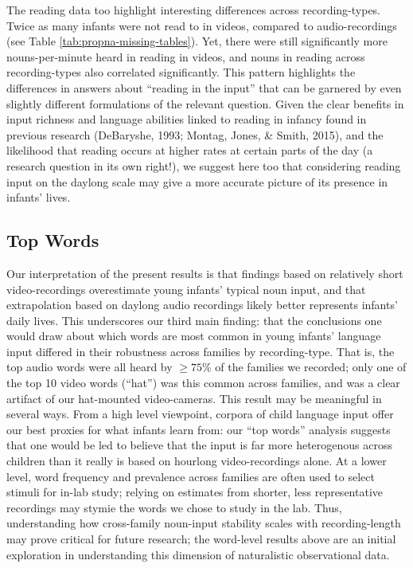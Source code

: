 \documentclass[floatsintext,man]{apa6}
\theoremstyle{definition}
\theoremstyle{definition}
\theoremstyle{definition}
\theoremstyle{remark}
\begin{document}
The reading data too highlight interesting differences across
recording-types. Twice as many infants were not read to in videos,
compared to audio-recordings (see Table
\ref{tab:propna-missing-tables}). Yet, there were still significantly
more nouns-per-minute heard in reading in videos, and nouns in reading
across recording-types also correlated significantly. This pattern
highlights the differences in answers about \enquote{reading in the
input} that can be garnered by even slightly different formulations of
the relevant question. Given the clear benefits in input richness and
language abilities linked to reading in infancy found in previous
research (DeBaryshe, 1993; Montag, Jones, \& Smith, 2015), and the
likelihood that reading occurs at higher rates at certain parts of the
day (a research question in its own right!), we suggest here too that
considering reading input on the daylong scale may give a more accurate
picture of its presence in infants' lives.

\subsection{Top Words}\label{top-words}

Our interpretation of the present results is that findings based on
relatively short video-recordings overestimate young infants' typical
noun input, and that extrapolation based on daylong audio recordings
likely better represents infants' daily lives. This underscores our
third main finding: that the conclusions one would draw about which
words are most common in young infants' language input differed in their
robustness across families by recording-type. That is, the top audio
words were all heard by \(\geq 75\%\) of the families we recorded; only
one of the top 10 video words (\enquote{hat}) was this common across
families, and was a clear artifact of our hat-mounted video-cameras.
This result may be meaningful in several ways. From a high level
viewpoint, corpora of child language input offer our best proxies for
what infants learn from: our \enquote{top words} analysis suggests that
one would be led to believe that the input is far more heterogenous
across children than it really is based on hourlong video-recordings
alone. At a lower level, word frequency and prevalence across families
are often used to select stimuli for in-lab study; relying on estimates
from shorter, less representative recordings may stymie the words we
chose to study in the lab. Thus, understanding how cross-family
noun-input stability scales with recording-length may prove critical for
future research; the word-level results above are an initial exploration
in understanding this dimension of naturalistic observational data.
\end{document}
